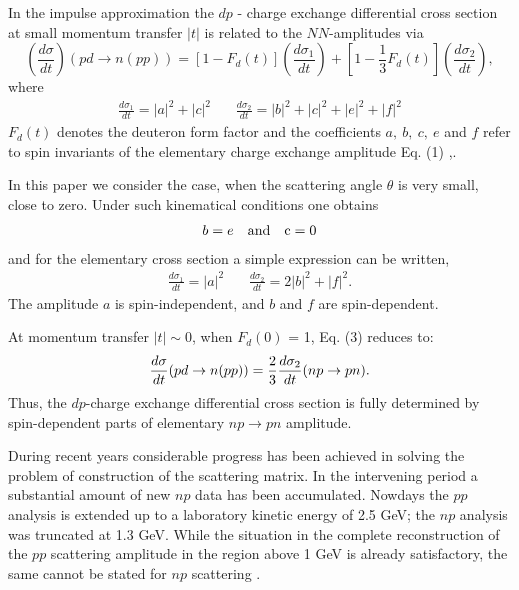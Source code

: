 In the impulse approximation the $dp$ - charge exchange
differential cross section at  small momentum transfer $|t|$ is related to the
$NN$-amplitudes via
\begin{equation}
\left( \frac{d\sigma }{dt}\right) (pd\rightarrow n(pp))=[1-F_d(t)]\left(
\frac{d\sigma _1}{dt}\right) +[1-\frac{1}{3}F_d(t)]
\left(\frac{d\sigma _2}{dt}\right),
\end{equation}
where
\begin{eqnarray}
\frac{d\sigma _1}{dt}=|a|^2+|c|^2 ~~~~~~~~
\frac{d\sigma _2}{dt}=|b|^2+|c|^2+|e|^2+|f|^2
\end{eqnarray}
 $F_d (t)$ denotes the deuteron form factor
 and the coefficients $a,~b,~c,~e$ and $f$ refer to spin invariants of the
 elementary charge exchange amplitude Eq. (1) \cite{Dean1},\cite{Ala}.

In this paper we consider the case, when the scattering angle $\theta$
is very small, close to zero. Under such kinematical conditions
one obtains
\begin{eqnarray}
b=e ~~~ \rm {and} ~~~c=0
\end{eqnarray}
and for the elementary cross section a simple expression can be written,
\begin{eqnarray}
\frac{d\sigma _1}{dt}=|a|^2 ~~~~~~~~
\frac{d\sigma _2}{dt}=2|b|^2+|f|^2 .
\end{eqnarray}
The amplitude $a$ is spin-independent, and $b$ and $f$ are spin-dependent.

At momentum transfer $\vert t \vert\sim 0$, when $F_d (0)$ = 1,
Eq. (3) reduces to:
\begin{equation}
\frac{d\sigma }{dt}(pd\rightarrow n(pp))=\frac 23\frac{d\sigma _2}{%
dt}(np\rightarrow pn).
\end{equation}
Thus, the $dp$-charge exchange differential cross section is fully determined
by spin-dependent parts of elementary $np\to pn$ amplitude.

During recent years  considerable progress has been achieved in solving
the problem of  construction of the scattering matrix.
In the intervening period a substantial amount of new $np$ data has been
accumulated.
Nowdays the $pp$ analysis is extended up to a laboratory kinetic energy of
2.5 GeV; the $np$ analysis was truncated at 1.3 GeV. While
the  situation in the complete reconstruction of the $pp$ scattering
 amplitude in the region above 1 GeV
 is  already satisfactory, the same cannot
be stated for $np$ scattering \cite{Arn}.

